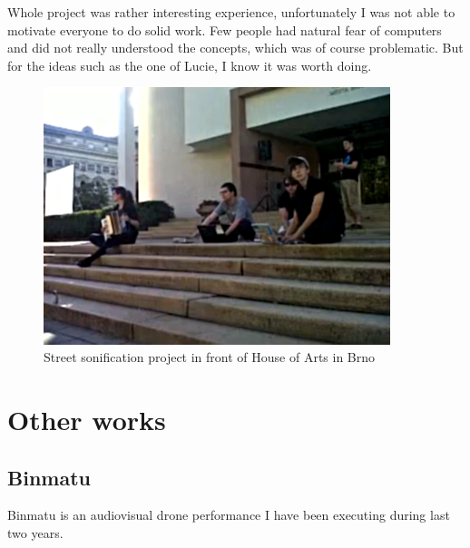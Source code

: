 \documentclass[12pt,a4paper,oneside]{report}
\begin{document}
Whole project was rather interesting experience, unfortunately I was not able to motivate everyone to do solid work. Few people had natural fear of computers and did not really understood the concepts, which was of course problematic. But for the ideas such as the one of Lucie, I know it was worth doing.

\begin{figure}  
  \centering
    \includegraphics[width=0.9\textwidth]{img/workshop}
	\caption{Street sonification project in front of House of Arts in Brno}
	\label{fig:workshop}
\end{figure}

\chapter{Other works} 
\section{Binmatu} Binmatu is an audiovisual drone performance I have been executing during last two years.
\end{document}
